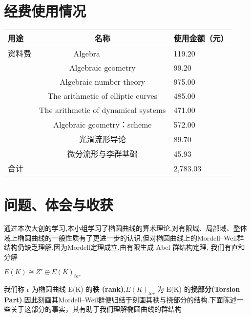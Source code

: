 \documentclass[11pt]{ctexart}
\begin{document}
\section{经费使用情况}

\noindent
\begin{tabular}{|l|c|p{4cm}|}
	\hline
	用途&名称&	使用金额（元）
	\\
	
	\hline
    资料费&Algebra~~~~~~~~&119.20
	
	\\
	\hline
	~&Algebraic geometry&99.20

	\\
	\hline
    ~&Algebraic number theory&975.00

    \\
    \hline
	&The arithmetic of elliptic curves&485.00

	\\
	\hline
    &The arithmetic of dynamical systems&471.00

    \\
	\hline
    &Algebraic geometry：scheme&572.00

    \\
	\hline
     &光滑流形导论&89.70

    \\
	\hline
      &微分流形与李群基础&45.93

    \\
	\hline

	合计&&2,783.03
	
	\\
	\hline
\end{tabular}
\section{问题、体会与收获}
通过本次大创的学习,本小组学习了椭圆曲线的算术理论,对有限域、局部域、整体域上椭圆曲线的一般性质有了更进一步的认识,但对椭圆曲线上的Mordell--Weil群结构仍缺乏理解.因为Mordell定理成立,由有限生成 Abel 群结构定理, 我们有直和分解

\begin{center}
    $E(K)\cong Z^r\oplus E(K)_{tor}$
\end{center}
我们称 r 为椭圆曲线 E(K) 的\textbf{秩 (rank)},$E(K)_{tor}$ 为 E(K) 的\textbf{挠部分(Torsion Part)}.因此刻画其Mordell--Weil群便归结于刻画其秩与挠部分的结构.下面陈述一些关于这部分的事实，其有助于我们理解椭圆曲线的群结构
\end{document}
